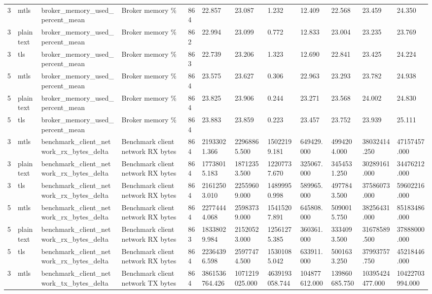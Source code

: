 \begin{longtable}{llllllllllll}
3 & mtls & broker\_memory\_used\_percent\_mean & Broker memory \% & 864 & 22.857 & 23.087 & 1.232 & 12.409 & 22.568 & 23.459 & 24.350 \\
3 & plaintext & broker\_memory\_used\_percent\_mean & Broker memory \% & 862 & 22.994 & 23.099 & 0.772 & 12.833 & 23.004 & 23.235 & 23.769 \\
3 & tls & broker\_memory\_used\_percent\_mean & Broker memory \% & 863 & 22.739 & 23.206 & 1.323 & 12.690 & 22.841 & 23.425 & 24.224 \\
5 & mtls & broker\_memory\_used\_percent\_mean & Broker memory \% & 864 & 23.575 & 23.627 & 0.306 & 22.963 & 23.293 & 23.782 & 24.938 \\
5 & plaintext & broker\_memory\_used\_percent\_mean & Broker memory \% & 864 & 23.825 & 23.906 & 0.244 & 23.271 & 23.568 & 24.002 & 24.830 \\
5 & tls & broker\_memory\_used\_percent\_mean & Broker memory \% & 864 & 23.883 & 23.859 & 0.223 & 23.457 & 23.752 & 23.939 & 25.111 \\
3 & mtls & benchmark\_client\_network\_rx\_bytes\_delta & Benchmark client network RX bytes & 864 & 21933021.366 & 22968865.500 & 15022199.181 & 649429.000 & 4994204.000 & 38032414.250 & 47157457.000 \\
3 & plaintext & benchmark\_client\_network\_rx\_bytes\_delta & Benchmark client network RX bytes & 864 & 17738015.183 & 18712353.500 & 12207737.670 & 325067.000 & 3454531.250 & 30289161.000 & 34476212.000 \\
3 & tls & benchmark\_client\_network\_rx\_bytes\_delta & Benchmark client network RX bytes & 864 & 21612503.010 & 22559609.000 & 14899950.998 & 589965.000 & 4977843.500 & 37586073.000 & 59602216.000 \\
5 & mtls & benchmark\_client\_network\_rx\_bytes\_delta & Benchmark client network RX bytes & 864 & 22774444.068 & 25983739.000 & 15415207.891 & 645808.000 & 5090015.750 & 38256431.000 & 85183486.000 \\
5 & plaintext & benchmark\_client\_network\_rx\_bytes\_delta & Benchmark client network RX bytes & 863 & 18338029.984 & 21520523.000 & 12561275.385 & 360361.000 & 3334093.500 & 31678589.500 & 37888000.000 \\
5 & tls & benchmark\_client\_network\_rx\_bytes\_delta & Benchmark client network RX bytes & 864 & 22364396.598 & 25977474.500 & 15301085.042 & 633911.000 & 5001633.250 & 37993757.750 & 45218446.000 \\
3 & mtls & benchmark\_client\_network\_tx\_bytes\_delta & Benchmark client network TX bytes & 864 & 3861536764.426 & 1071219025.000 & 4639193058.744 & 104877612.000 & 139860685.750 & 10395424477.000 & 10422703994.000 \\

\end{longtable}

